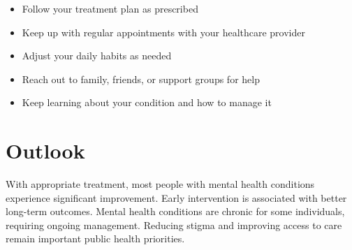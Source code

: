 \begin{itemize}[noitemsep]
  \item Follow your treatment plan as prescribed
  \item Keep up with regular appointments with your healthcare provider
  \item Adjust your daily habits as needed
  \item Reach out to family, friends, or support groups for help
  \item Keep learning about your condition and how to manage it
\end{itemize}

\section{Outlook}
With appropriate treatment, most people with mental health conditions experience significant improvement. Early intervention is associated with better long-term outcomes. Mental health conditions are chronic for some individuals, requiring ongoing management. Reducing stigma and improving access to care remain important public health priorities.
